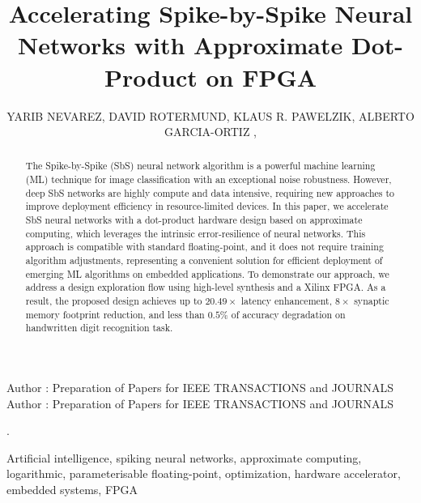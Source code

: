 \title {Accelerating Spike-by-Spike Neural Networks with Approximate Dot-Product on FPGA}

\author{
	\uppercase{Yarib Nevarez},	
	\uppercase{David Rotermund},
	\uppercase{Klaus R. Pawelzik},
	\uppercase{Alberto Garcia-Ortiz} ,
}

\address[1]{Institute of Electrodynamics and Microelectronics, University of Bremen, Bremen 28359, Germany (e-mail: nevarez@item.uni-bremen.de)}

\address[2]{Institute for Theoretical Physics, University of Bremen, Bremen 28359, Germany (e-mail: davrot@@neuro.uni-bremen.de)}

\address[3]{Institute for Theoretical Physics, University of Bremen, Bremen 28359, Germany (e-mail: pawelzik@@neuro.uni-bremen.de)}

\address[4]{Institute of Electrodynamics and Microelectronics, University of Bremen, Bremen 28359, Germany (e-mail: agaracia@item.uni-bremen.de)}


\markboth
{Author \headeretal: Preparation of Papers for IEEE TRANSACTIONS and JOURNALS}
{Author \headeretal: Preparation of Papers for IEEE TRANSACTIONS and JOURNALS}

.

\begin{abstract}
The Spike-by-Spike (SbS) neural network algorithm is a powerful machine learning (ML) technique for image classification with an exceptional noise robustness. However, deep SbS networks are highly compute and data intensive, requiring new approaches to improve deployment efficiency in resource-limited devices. In this paper, we accelerate SbS neural networks with a dot-product hardware design based on approximate computing, which leverages the intrinsic error-resilience of neural networks. This approach is compatible with standard floating-point, and it does not require training algorithm adjustments, representing a convenient solution for efficient deployment of emerging ML algorithms on embedded applications. To demonstrate our approach, we address a design exploration flow using high-level synthesis and a Xilinx FPGA. As a result, the proposed design achieves up to $20.49\times$ latency enhancement, $8\times$ synaptic memory footprint reduction, and less than $0.5\%$ of accuracy degradation on handwritten digit recognition task.
	
\end{abstract}

\begin{keywords}
Artificial intelligence, spiking neural networks, approximate computing, logarithmic, parameterisable floating-point, optimization, hardware accelerator, embedded systems, FPGA
\end{keywords}

\titlepgskip=-15pt

\maketitle
